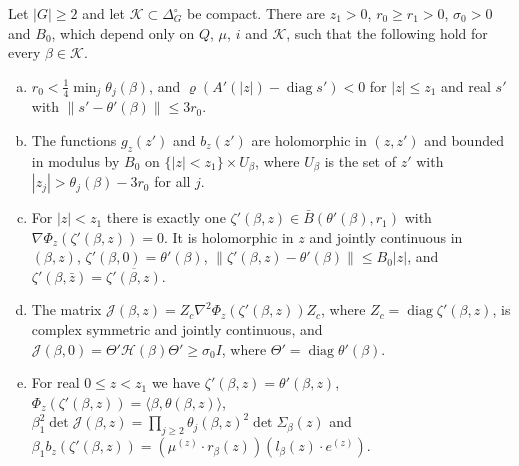 \begin{lemma}\label{lem:critical}
Let $|G|\ge2$ and let $\mathcal K\subset\Delta_G^\circ$ be compact. There are $z_1>0$,
$r_0\ge r_1>0$, $\sigma_0>0$ and $B_0$, which depend only on $Q$, $\mu$, $i$ and $\mathcal K$, such
that the following hold for every $\beta\in\mathcal K$.
\begin{enumerate}[(a)]
\item $r_0<\frac14\min_j\theta_j(\beta)$, and $\varrho(A'(|z|)-\operatorname{diag}s')<0$ for
$|z|\le z_1$ and real $s'$ with $\lVert s'-\theta'(\beta)\rVert\le3r_0$.
\item The functions $g_z(z')$ and $b_z(z')$ are holomorphic in $(z,z')$ and bounded in modulus by
$B_0$ on $\{|z|<z_1\}\times U_\beta$, where $U_\beta$ is the set of $z'$ with
$|z_j|>\theta_j(\beta)-3r_0$ for all $j$.
\item For $|z|<z_1$ there is exactly one $\zeta'(\beta,z)\in\bar B(\theta'(\beta),r_1)$ with
$\nabla\Phi_z(\zeta'(\beta,z))=0$. It is holomorphic in $z$ and jointly continuous in
$(\beta,z)$, $\zeta'(\beta,0)=\theta'(\beta)$, $\lVert\zeta'(\beta,z)-\theta'(\beta)\rVert\le B_0|z|$,
and $\zeta'(\beta,\bar z)=\overline{\zeta'(\beta,z)}$.
\item The matrix $\mathcal J(\beta,z)=Z_c\nabla^2\Phi_z(\zeta'(\beta,z))Z_c$, where
$Z_c=\operatorname{diag}\zeta'(\beta,z)$, is complex symmetric and jointly continuous, and
$\mathcal J(\beta,0)=\Theta'\mathcal H(\beta)\Theta'\ge\sigma_0I$, where
$\Theta'=\operatorname{diag}\theta'(\beta)$.
\item For real $0\le z<z_1$ we have $\zeta'(\beta,z)=\theta'(\beta,z)$,
$\Phi_z(\zeta'(\beta,z))=\langle\beta,\theta(\beta,z)\rangle$,
$\beta_1^2\det\mathcal J(\beta,z)=\prod_{j\ge2}\theta_j(\beta,z)^2\det\Sigma_\beta(z)$ and
$\beta_1b_z(\zeta'(\beta,z))=(\mu^{(z)}\cdot r_\beta(z))(l_\beta(z)\cdot e^{(z)})$.
\end{enumerate}
\end{lemma}

